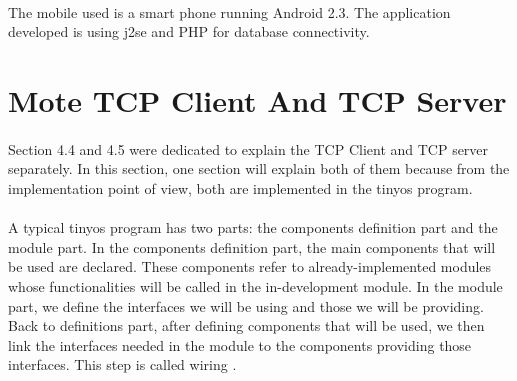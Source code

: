 \documentclass[oneside,12pt,a4paper,final]{book}
\begin{document}
\paragraph{}
The mobile used is a smart phone running Android 2.3. The application developed is using \gls{j2se} and PHP for database connectivity.

\section{Mote TCP Client And TCP Server}
\paragraph{}
Section 4.4 and 4.5 were dedicated to explain the TCP Client and TCP server separately. In this section, one section will explain both of them because from the implementation point of view,  both are implemented in the \gls{tinyos} program.
\paragraph{}
A typical \gls{tinyos} program has two parts: the components definition part and the module part. In the components definition part, the main components that will be used are declared. These components refer to already-implemented modules whose functionalities will be called in the in-development module. In the module part, we define the interfaces we will be using and those we will be providing. Back to definitions part, after defining components that will be used, we then link the interfaces needed in the module to the components providing those interfaces. This step is called wiring \cite{ref14}.
\end{document}
